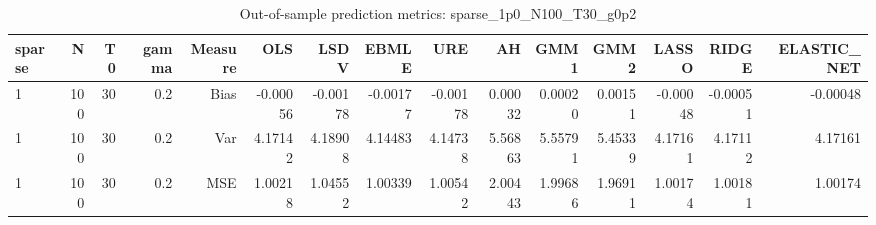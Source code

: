 \begin{table}[!htbp]\centering
\caption{Out-of-sample prediction metrics: sparse_1p0_N100_T30_g0p2}
\label{tab:table3_sparse_1p0_N100_T30_g0p2}
\begin{tabular}{lrrrrrrrrrrrrrr}
\hline
sparse & N & T0 & gamma & Measure & OLS & LSDV & EBMLE & URE & AH & GMM1 & GMM2 & LASSO & RIDGE & ELASTIC_NET \\
\hline
1 & 100 & 30 & 0.2 & Bias & -0.00056 & -0.00178 & -0.00177 & -0.00178 & 0.00032 & 0.00020 & 0.00151 & -0.00048 & -0.00051 & -0.00048 \\
1 & 100 & 30 & 0.2 & Var & 4.17142 & 4.18908 & 4.14483 & 4.14738 & 5.56863 & 5.55791 & 5.45339 & 4.17161 & 4.17112 & 4.17161 \\
1 & 100 & 30 & 0.2 & MSE & 1.00218 & 1.04552 & 1.00339 & 1.00542 & 2.00443 & 1.99686 & 1.96911 & 1.00174 & 1.00181 & 1.00174 \\
\hline
\end{tabular}
\end{table}

